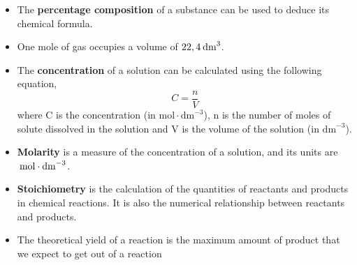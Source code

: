 \begin{itemize}[noitemsep]
\label{m38712*uid116}\item The \textbf{percentage composition} of a substance can be used to deduce its chemical formula.
\label{m38712*uid117}\item One mole of gas occupies a volume of $22,4\phantom{\rule{2pt}{0ex}}{\mathrm{dm}}^{3}$.
\label{m38712*uid118}\item The \textbf{concentration} of a solution can be calculated using the following equation,
\label{m38712*id286019}\nopagebreak\noindent{}
    \begin{equation}
    C=\frac{n}{V}\tag{18.54}
      \end{equation}
where C is the concentration (in $\mathrm{mol}\ensuremath{\cdot}{\mathrm{dm}}^{-3}$), n is the number of moles of solute dissolved in the solution and V is the volume of the solution (in ${\mathrm{dm}}^{-3}$).
\label{m38712*uid119}\item \textbf{Molarity} is a measure of the concentration of a solution, and its units are $\phantom{\rule{2pt}{0ex}}\mathrm{mol}\ensuremath{\cdot}{\mathrm{dm}}^{-3}$.
\label{m38712*uid120}\item \textbf{Stoichiometry} is the calculation of the quantities of reactants and products in chemical reactions. It is also the numerical relationship between reactants and products.
\item The theoretical yield of a reaction is the maximum amount of product that we expect to get out of a reaction\end{itemize}
\label{m38712*secfhsst!!!underscore!!!id2334}
